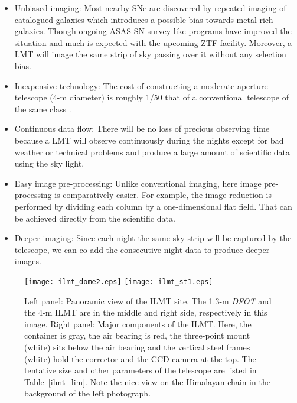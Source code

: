 \documentclass[useAMS,usenatbib]{mnras}
\begin{document}
\begin{itemize}

\item Unbiased imaging:
Most nearby SNe are discovered by repeated imaging of catalogued galaxies \citep[][]{2001ASPC..246..121F} 
which introduces a possible bias towards metal rich galaxies. 
Though ongoing ASAS-SN survey like programs have improved the situation and much is expected with the 
upcoming ZTF facility. Moreover, a LMT will image the same strip of sky passing over it without any selection 
bias.

\item Inexpensive technology: 
The cost of constructing a moderate aperture telescope (4-m diameter) is roughly 1/50 that of a conventional 
telescope of the same class \citep{Borra_1a,2003A&A...404...47B}.

\item Continuous data flow:
There will be no loss of precious observing time because a LMT will observe continuously during the nights 
except for bad weather or technical problems and produce a large amount of scientific data using the sky light.

\item Easy image pre-processing:
Unlike conventional imaging, here image pre-processing is comparatively easier. For example, the image 
reduction is performed by dividing each column by a one-dimensional flat field. That can be achieved 
directly from the scientific data.

\item Deeper imaging:
Since each night the same sky strip will be captured by the telescope, we can co-add the consecutive night 
data to produce deeper images.

\end{itemize}

\begin{figure*}
\centering
\texttt{[image: ilmt\_dome2.eps]}
\texttt{[image: ilmt\_st1.eps]}
\caption{Left panel: Panoramic view of the ILMT site. The 1.3-m \textit{DFOT} and the 4-m ILMT are
in the middle and right side, respectively in this image. Right panel: Major components of 
the ILMT. Here, the container is gray, the air bearing is red, the three-point mount (white) sits 
below the air bearing and the vertical steel frames (white) hold the corrector and the CCD camera at
the top. The tentative size and other parameters of the telescope are listed in Table~\ref{ilmt_lim}.
Note the nice view on the Himalayan chain in the background of the left photograph.}
\label{ILMT_pan}
\end{figure*}
\end{document}
